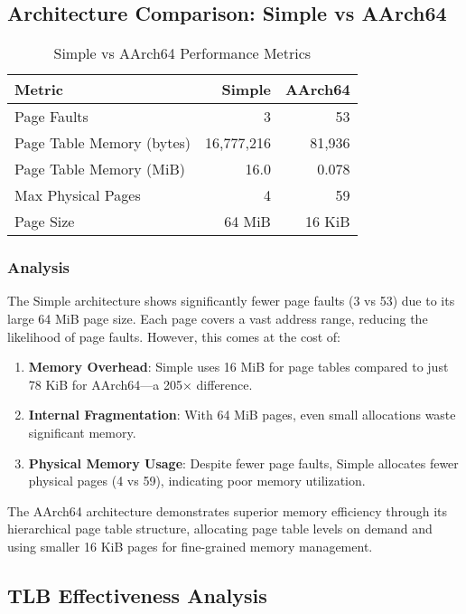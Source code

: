\documentclass[12pt,a4paper]{article}
\begin{document}
\subsection{Architecture Comparison: Simple vs AArch64}

\begin{table}[h]
\centering
\caption{Simple vs AArch64 Performance Metrics}
\label{tab:arch-comparison}
\begin{tabular}{lrr}
\toprule
\textbf{Metric} & \textbf{Simple} & \textbf{AArch64} \\
\midrule
Page Faults & 3 & 53 \\
Page Table Memory (bytes) & 16,777,216 & 81,936 \\
Page Table Memory (MiB) & 16.0 & 0.078 \\
Max Physical Pages & 4 & 59 \\
Page Size & 64 MiB & 16 KiB \\
\bottomrule
\end{tabular}
\end{table}

\subsubsection{Analysis}

The Simple architecture shows significantly fewer page faults (3 vs 53) due to its large 64 MiB page size. Each page covers a vast address range, reducing the likelihood of page faults. However, this comes at the cost of:

\begin{enumerate}
    \item \textbf{Memory Overhead}: Simple uses 16 MiB for page tables compared to just 78 KiB for AArch64—a 205× difference.
    \item \textbf{Internal Fragmentation}: With 64 MiB pages, even small allocations waste significant memory.
    \item \textbf{Physical Memory Usage}: Despite fewer page faults, Simple allocates fewer physical pages (4 vs 59), indicating poor memory utilization.
\end{enumerate}

The AArch64 architecture demonstrates superior memory efficiency through its hierarchical page table structure, allocating page table levels on demand and using smaller 16 KiB pages for fine-grained memory management.

\subsection{TLB Effectiveness Analysis}
\end{document}
